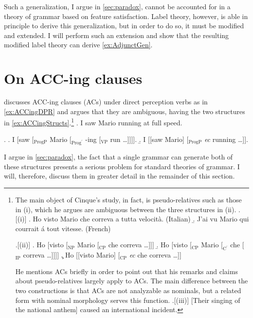 \documentclass[MilwayThesis]{subfiles}
\begin{document}
Such a generalization, I argue in \cref{sec:paradox}, cannot be accounted for in a theory of grammar based on feature satisfaction.
Label theory, however, is able in principle to derive this generalization, but in order to do so, it must be modified and extended.
I will perform such an extension and show that the resulting modified label theory can derive \cref{ex:AdjunctGen}.

\section{On ACC-ing clauses}

\textcite{cinque1996pseudo} discusses ACC-ing clauses (ACs) under direct perception verbs as in \cref{ex:ACCingDPR} and argues that they are ambiguous, having the two structures in \cref{ex:ACCingStructs}.\footnote{
	The main object of Cinque's study, in fact, is pseudo-relatives such as those in (i), which he argues are ambiguous between the three structures in (ii).
	\ex.[(i)]\label{ex:PR}
	\a. Ho visto Mario che correva a tutta velocit\`a. (Italian)
	\b. J'ai vu Mario qui courrait \'a tout vitesse. (French)

	\ex.[(ii)]\label{ex:PRStruct}
	\a. Ho [visto [$_\text{NP}$ Mario [$_\text{CP}$ che correva \ldots ]]]
	\b. Ho [visto [$_\text{CP}$ Mario [$_{\text{C}^\prime}$ che [$_\text{IP}$ correva \ldots ]]]]
	\c. Ho [[visto Mario] [$_\text{CP}$ \textit{ec} che correva \ldots]]

	He mentions ACs briefly in order to point out that his remarks and claims about pseudo-relatives largely apply to ACs.
	The main difference between the two constructions is that ACs are not analyzable as nominals, but a related form with nominal morphology serves this function.
	\ex.[(iii)] [Their singing of the national anthem] caused an international incident.

}
\ex. I saw Mario running at full speed. \label{ex:ACCingDPR} 

\ex.\label{ex:ACCingStructs}
\a. I [saw [$_\text{ProgP}$ Mario [$_{\text{Prog}^\prime}$ -ing [$_\text{VP}$ run \ldots]]]].
\b. I [[saw Mario] [$_\text{ProgP}$ \textit{ec} running \ldots]].

I argue in \cref{sec:paradox}, the fact that a single grammar can generate both of these structures presents a serious problem for standard theories of grammar.
I will, therefore, discuss them in greater detail in the remainder of this section.
\end{document}
